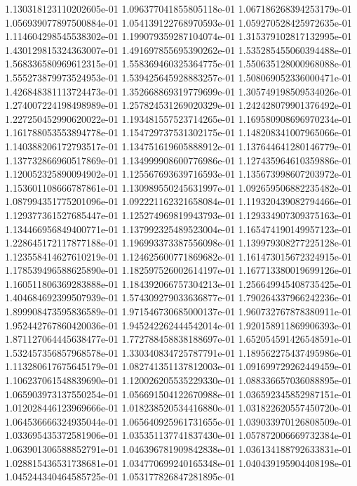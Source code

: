 1.130318123110202605e-01
1.096377041855805118e-01
1.067186268394253179e-01
1.056939077897500884e-01
1.054139122768970593e-01
1.059270528425972635e-01
1.114604298545538302e-01
1.199079359287104074e-01
1.315379102817132995e-01
1.430129815324363007e-01
1.491697855695390262e-01
1.535285455060394488e-01
1.568336580969612315e-01
1.558369460325364775e-01
1.550635128000968088e-01
1.555273879973524953e-01
1.539425645928883257e-01
1.508069052336000471e-01
1.426848381113724473e-01
1.352668869319779699e-01
1.305749198509534026e-01
1.274007224198498989e-01
1.257824531269020329e-01
1.242428079901376492e-01
1.227250452990620022e-01
1.193481557523714265e-01
1.169580908696970234e-01
1.161788053553894778e-01
1.154729737531302175e-01
1.148208341007965066e-01
1.140388206172793517e-01
1.134751619605888912e-01
1.137644641280146779e-01
1.137732866960517869e-01
1.134999908600776986e-01
1.127435964610359886e-01
1.120052325890094902e-01
1.125567693639716593e-01
1.135673998607203972e-01
1.153601108666787861e-01
1.130989550245631997e-01
1.092659506882235482e-01
1.087994351775201096e-01
1.092221162321658084e-01
1.119320439082794466e-01
1.129377361527685447e-01
1.125274969819943793e-01
1.129334907309375163e-01
1.134466956849400771e-01
1.137992325489523004e-01
1.165474190149957123e-01
1.228645172117877188e-01
1.196993373387556098e-01
1.139979308277225128e-01
1.123558414627610219e-01
1.124625600771869682e-01
1.161473015672324915e-01
1.178539496588625890e-01
1.182597526002614197e-01
1.167713380019699126e-01
1.160511806369283888e-01
1.184392066757304213e-01
1.256649945408735425e-01
1.404684692399507939e-01
1.574309279033636877e-01
1.790264337966242236e-01
1.899908473595836589e-01
1.971546730685000137e-01
1.960732767878380911e-01
1.952442767860420036e-01
1.945242262444542014e-01
1.920158911869906393e-01
1.871127064445638477e-01
1.772788458838188697e-01
1.652054591426548591e-01
1.532457356857968578e-01
1.330340834725787791e-01
1.189562275437495986e-01
1.113280617675645179e-01
1.082741351137812003e-01
1.091699729262449459e-01
1.106237061548839690e-01
1.120026205535229330e-01
1.088336657036088895e-01
1.065903973137550254e-01
1.056691504122670988e-01
1.036592345852987151e-01
1.012028446123969666e-01
1.018238520534416880e-01
1.031822620557450720e-01
1.064536666324935044e-01
1.065640925961731655e-01
1.039033970126808509e-01
1.033695435372581906e-01
1.035351137741837430e-01
1.057872006669732384e-01
1.063901306588852791e-01
1.046396781909842838e-01
1.036134188792633831e-01
1.028815436531738681e-01
1.034770699240165348e-01
1.040439195904408198e-01
1.045244340464585725e-01
1.053177826847281895e-01

